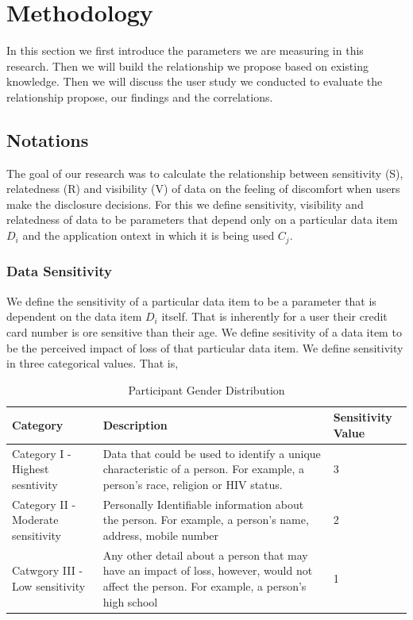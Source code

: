 \documentclass[conference]{IEEEtran}
\begin{document}
\section {Methodology}

In this section we first introduce the parameters we are measuring in this research. Then we will build the relationship we propose based on existing knowledge. Then we will discuss the user study we conducted to evaluate the relationship propose, our findings and the correlations.

\subsection {Notations}

The goal of our research was to calculate the relationship between sensitivity (S), relatedness (R) and visibility (V) of data on the feeling of discomfort when users make the disclosure decisions. For this we define sensitivity, visibility and relatedness of data to be parameters that depend only on a particular data item \textit{$D_i$} and the application ontext in which it is being used \textit{$C_j$}.

\subsubsection{Data Sensitivity} We define the sensitivity of a particular data item to be a parameter that is dependent on the data item \textit{$D_i$} itself. That is inherently for a user their credit card number is ore sensitive than their age. We define sesitivity of a data item to be the perceived impact of loss of that particular data item. We define sensitivity in three categorical values. That is, 

\begin{center}
\begin{table}[htbp]
\caption{Participant Gender Distribution}
\begin{center}
\begin{tabular}{|l|l|l|} 
\hline
Category & Description & Sensitivity Value \\
\hline
Category I - Highest sesntivity & Data that could be used to identify a unique characteristic of a person. For example, a person's race, religion or HIV status. & 3 \\
\hline
Category II - Moderate sensitivity & Personally Identifiable information about the person. For example, a person's name, address, mobile number & 2 \\
\hline
Catwgory III - Low sensitivity & Any other detail about a person that may have an impact of loss, however, would not affect the person. For example, a person's high school & 1 \\
\hline
\end{tabular}
\end{center}
\end{table}
\end{center} 
\end{document}

